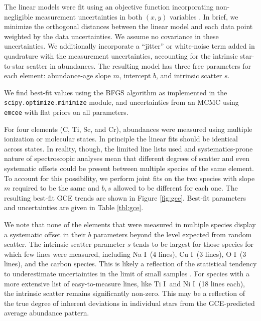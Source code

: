 \documentclass[twocolumn, trackchanges]{aastex62}
\newcommand{\I}{\textsc{I}}
\newcommand{\acronym}[1]{{\small{#1}}}
\begin{document}
The linear models were fit using an objective function incorporating non-negligible measurement uncertainties in both $(x, y)$ variables \citep{hogg10}. In brief, we minimize the orthogonal distances between the linear model and each data point weighted by the data uncertainties. We assume no covariance in these uncertainties. We additionally incorporate a ``jitter'' or white-noise term added in quadrature with the measurement uncertainties, accounting for the intrinsic star-to-star scatter in abundances. The resulting model has three free parameters for each element: abundance-age slope $m$, intercept $b$, and intrinsic scatter $s$. 

We find best-fit values using the \acronym{BFGS} algorithm as implemented in the \texttt{scipy.optimize.minimize} module, and uncertainties from an \acronym{MCMC} using \texttt{emcee} \citep{emcee} with flat priors on all parameters.

For four elements (C, Ti, Sc, and Cr), abundances were measured using multiple ionization or molecular states. In principle the linear fits should be identical across states. In reality, though, the limited line lists used and systematics-prone nature of spectroscopic analyses mean that different degrees of scatter and even systematic offsets could be present between multiple species of the same element. To account for this possibility, we perform joint fits on the two species with slope $m$ required to be the same and $b, s$ allowed to be different for each one. The resulting best-fit \acronym{GCE} trends are shown in Figure \ref{fig:gce}. Best-fit parameters and uncertainties are given in Table \ref{tbl:gce}.

We note that none of the elements that were measured in multiple species display a systematic offset in their $b$ parameters beyond the level expected from random scatter. The intrinsic scatter parameter $s$ tends to be largest for those species for which few lines were measured, including Na \I\ (4 lines), Cu \I\ (3 lines), O \I\ (3 lines), and the carbon species. This is likely a reflection of the statistical tendency to underestimate uncertainties in the limit of small samples \citep{adibekyan15}. For species with a more extensive list of easy-to-measure lines, like Ti \I\ and Ni \I\ (18 lines each), the intrinsic scatter remains significantly non-zero. This may be a reflection of the true degree of inherent deviations in individual stars from the \acronym{GCE}-predicted average abundance pattern.
\end{document}
